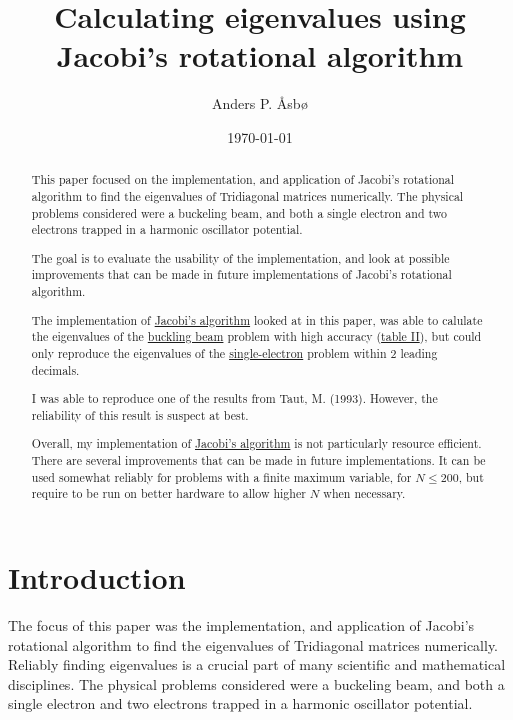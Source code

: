 \documentclass[english,notitlepage,reprint]{revtex4-1}  %
\begin{document}
\title{Calculating eigenvalues using Jacobi's rotational algorithm}   %
\author{Anders P. Åsbø}               %
\date{\today}
\noaffiliation                            %

\begin{abstract}
This paper focused on the implementation, and application of Jacobi's rotational algorithm to find the eigenvalues of Tridiagonal matrices numerically. The physical problems considered were a buckeling beam, and both a single electron and two electrons trapped in a harmonic oscillator potential.

The goal is to evaluate the usability of the implementation, and look at possible improvements that can be made in future implementations of Jacobi's rotational algorithm.

The implementation of \hyperref[subsec:32]{Jacobi's algorithm} looked at in this paper, was able to calulate the eigenvalues of the \hyperref[subsec:21]{buckling beam} problem with high accuracy (\hyperref[tab:421]{table II}), but could only reproduce the eigenvalues of the \hyperref[subsec:23]{single-electron} problem within \(2\) leading decimals.

I was able to reproduce one of the results from Taut, M. (1993)\citep{PhysRevA.48.3561}. However, the reliability of this result is suspect at best.

Overall, my implementation of \hyperref[subsec:32]{Jacobi's algorithm} is not particularly resource efficient. There are several improvements that can be made in future implementations. It can be used somewhat reliably for problems with a finite maximum variable, for \(N \leq 200\), but require to be run on better hardware to allow higher \(N\) when necessary.
\end{abstract}

\maketitle
\tableofcontents

\section{Introduction}\label{sec:1}
The focus of this paper was the implementation, and application of Jacobi's rotational algorithm to find the eigenvalues of Tridiagonal matrices numerically. Reliably finding eigenvalues is a crucial part of many scientific and mathematical disciplines. The physical problems considered were a buckeling beam, and both a single electron and two electrons trapped in a harmonic oscillator potential.
\end{document}
